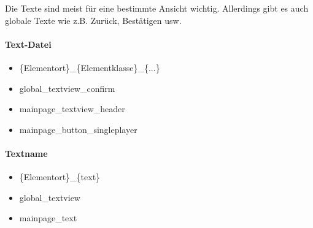 Die Texte sind meist für eine bestimmte Ansicht wichtig. Allerdings gibt es auch globale Texte wie z.B. Zurück, Bestätigen usw.

\paragraph{Text-Datei}

\begin{itemize}
	\item \{Elementort\}\_\{Elementklasse\}\_\{...\}
\end{itemize}

\begin{itemize}
\item global\_textview\_confirm
\item mainpage\_textview\_header 
\item mainpage\_button\_singleplayer 
\end{itemize}

\paragraph{Textname}

\begin{itemize}
	\item \{Elementort\}\_\{text\}
\end{itemize} 

\begin{itemize}
	\item global\_textview
	\item mainpage\_text
\end{itemize}